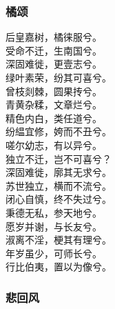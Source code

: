\documentclass[]{article}
\begin{document}
\hypertarget{header-n2876}{%
\subsubsection{橘颂}\label{header-n2876}}

后皇嘉树，橘徕服兮。\\
受命不迁，生南国兮。\\
深固难徙，更壹志兮。\\
绿叶素荣，纷其可喜兮。\\
曾枝剡棘，圆果抟兮。\\
青黄杂糅，文章烂兮。\\
精色内白，类任道兮。\\
纷緼宜修，姱而不丑兮。\\
嗟尔幼志，有以异兮。\\
独立不迁，岂不可喜兮？\\
深固难徙，廓其无求兮。\\
苏世独立，横而不流兮。\\
闭心自慎，终不失过兮。\\
秉德无私，参天地兮。\\
愿岁并谢，与长友兮。\\
淑离不淫，梗其有理兮。\\
年岁虽少，可师长兮。\\
行比伯夷，置以为像兮。

\hypertarget{header-n2881}{%
\subsubsection{悲回风}\label{header-n2881}}
\end{document}
